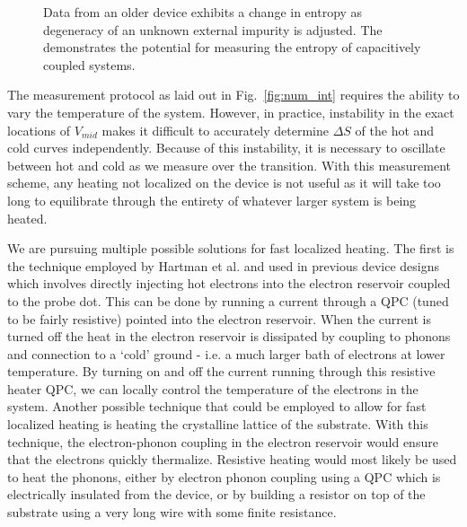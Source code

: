 \begin{figure}[h]
\centering
{}
\caption{ Data from an older device exhibits a change in entropy as degeneracy of an unknown external impurity is adjusted. The demonstrates the potential for measuring the entropy of capacitively coupled systems.}

\label{fig:sshape}       %
\end{figure}


The measurement protocol as laid out in Fig.~\ref{fig:num_int} requires the ability to vary the temperature of the system. However, in practice, instability in the exact locations of $V_{mid}$ makes it difficult to accurately determine $\Delta S$ of the hot and cold curves independently. Because of this instability, it is necessary to oscillate between hot and cold as we measure over the transition. With this measurement scheme, any heating not localized on the device is not useful as it will take too long to equilibrate through the entirety of whatever larger system is being heated.

We are pursuing multiple possible solutions for fast localized heating. The first is the technique employed by Hartman et al. and used in previous device designs which involves directly injecting hot electrons into the electron reservoir coupled to the probe dot. This can be done by running a current through a QPC (tuned to be fairly resistive) pointed into the electron reservoir. When the current is turned off the heat in the electron reservoir is dissipated by coupling to phonons and connection to a `cold' ground - i.e. a much larger bath of electrons at lower temperature. By turning on and off the current running through this resistive heater QPC, we can locally control the temperature of the electrons in the system. Another possible technique that could be employed to allow for fast localized heating is heating the crystalline lattice of the substrate. With this technique, the electron-phonon coupling in the electron reservoir would ensure that the electrons quickly thermalize. Resistive heating would most likely be used to heat the phonons, either by electron phonon coupling using a QPC which is electrically insulated from the device, or by building a resistor on top of the substrate using a very long wire with some finite resistance.

